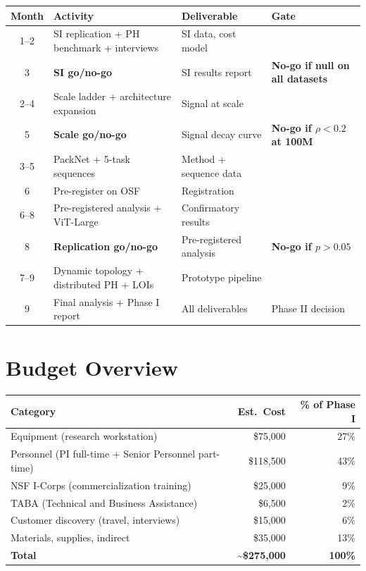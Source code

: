 \documentclass[11pt,letterpaper]{article}
\begin{document}
\begin{center}
\begin{tabular}{@{}clll@{}}
\toprule
\textbf{Month} & \textbf{Activity} & \textbf{Deliverable} & \textbf{Gate} \\
\midrule
1--2 & SI replication + PH benchmark + interviews & SI data, cost model & \\
3 & \textbf{SI go/no-go} & SI results report & \textbf{No-go if null on all datasets} \\
2--4 & Scale ladder + architecture expansion & Signal at scale & \\
5 & \textbf{Scale go/no-go} & Signal decay curve & \textbf{No-go if $\rho < 0.2$ at 100M} \\
3--5 & PackNet + 5-task sequences & Method + sequence data & \\
6 & Pre-register on OSF & Registration & \\
6--8 & Pre-registered analysis + ViT-Large & Confirmatory results & \\
8 & \textbf{Replication go/no-go} & Pre-registered analysis & \textbf{No-go if $p > 0.05$} \\
7--9 & Dynamic topology + distributed PH + LOIs & Prototype pipeline & \\
9 & Final analysis + Phase I report & All deliverables & Phase II decision \\
\bottomrule
\end{tabular}
\end{center}

\section{Budget Overview}

\begin{center}
\begin{tabular}{@{}lrr@{}}
\toprule
\textbf{Category} & \textbf{Est.\ Cost} & \textbf{\% of Phase I} \\
\midrule
Equipment (research workstation) & \$75,000 & 27\% \\
Personnel (PI full-time + Senior Personnel part-time) & \$118,500 & 43\% \\
NSF I-Corps (commercialization training) & \$25,000 & 9\% \\
TABA (Technical and Business Assistance) & \$6,500 & 2\% \\
Customer discovery (travel, interviews) & \$15,000 & 6\% \\
Materials, supplies, indirect & \$35,000 & 13\% \\
\midrule
\textbf{Total} & \textbf{\textasciitilde\$275,000} & \textbf{100\%} \\
\bottomrule
\end{tabular}
\end{center}
\end{document}
